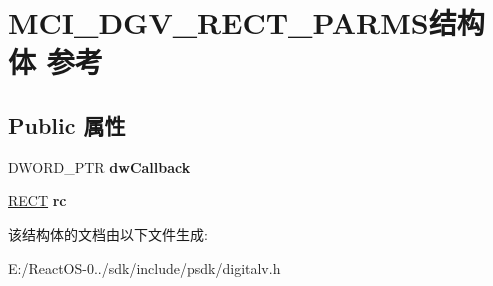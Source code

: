 \hypertarget{struct_m_c_i___d_g_v___r_e_c_t___p_a_r_m_s}{}\section{M\+C\+I\+\_\+\+D\+G\+V\+\_\+\+R\+E\+C\+T\+\_\+\+P\+A\+R\+M\+S结构体 参考}
\label{struct_m_c_i___d_g_v___r_e_c_t___p_a_r_m_s}
\subsection*{Public 属性}
\begin{DoxyCompactItemize}
\item 
\mbox{\label{struct_m_c_i___d_g_v___r_e_c_t___p_a_r_m_s_a99c1e4e7e5e9a67bf0a8b73f15287c9e}} 
D\+W\+O\+R\+D\+\_\+\+P\+TR {\bfseries dw\+Callback}
\item 
\mbox{\label{struct_m_c_i___d_g_v___r_e_c_t___p_a_r_m_s_ac4f2d707b1fd6c0401d2eb6c0096ab5d}} 
\hyperlink{structtag_r_e_c_t}{R\+E\+CT} {\bfseries rc}
\end{DoxyCompactItemize}


该结构体的文档由以下文件生成\+:\begin{DoxyCompactItemize}
\item 
E\+:/\+React\+O\+S-\/0../sdk/include/psdk/digitalv.\+h\end{DoxyCompactItemize}
